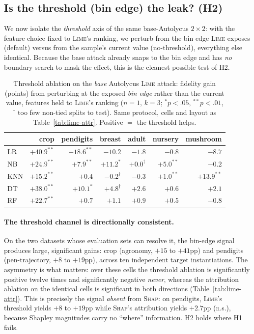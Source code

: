 \documentclass[sigconf,anonymous,review]{acmart}
\begin{document}
\subsection{Is the threshold (bin edge) the leak? (H2)}
\label{subsec:e3}
We now isolate the \emph{threshold} axis of the same base-Autolycus $2{\times}2$: with the feature
choice fixed to \textsc{Lime}'s ranking, we perturb from the bin edge \textsc{Lime} exposes (default)
versus from the sample's current value (no-threshold), everything else identical. Because the base
attack already snaps to the bin edge and has \emph{no} boundary search to mask the effect, this is
the cleanest possible test of H2.

\begin{table}[t]
\centering
\caption{Threshold ablation on the \emph{base} Autolycus \textsc{Lime} attack: fidelity gain (points) from perturbing at the
exposed \emph{bin edge} rather than the current value, features held to \textsc{Lime}'s ranking
($n{=}1$, $k{=}3$; $^{*}p{<}.05$, $^{**}p{<}.01$, $^{\dag}$ too few non-tied splits to test). Same
protocol, cells and layout as Table~\ref{tab:lime-attr}. Positive $=$ the threshold helps.}
\label{tab:lime-threshold}
\begin{tabular}{lrrrrrr}
\toprule
 & crop & pendigits & breast & adult & nursery & mushroom \\
\midrule
LR  & $+40.9^{**}$ & $+18.6^{**}$ & $-10.2$        & $-1.8$        & $-0.8$      & $-8.7$ \\
NB  & $+24.9^{**}$ & $+7.9^{**}$  & $+11.2^{*}$    & $+0.0^{\dag}$ & $+5.0^{**}$ & $-0.2$ \\
KNN & $+15.2^{**}$ & $+0.4$       & $-0.2^{\dag}$  & $-0.3$        & $+1.0^{**}$ & $+13.9^{**}$ \\
DT  & $+38.0^{**}$ & $+10.1^{*}$  & $+4.8^{\dag}$  & $+2.6$        & $+0.6$      & $+2.1$ \\
RF  & $+22.7^{**}$ & $+0.7$       & $+1.1$         & $+0.9$        & $+0.5$      & $-0.8$ \\
\bottomrule
\end{tabular}
\end{table}

\paragraph{The threshold channel is directionally consistent.} On the two datasets whose evaluation
sets can resolve it, the bin-edge signal produces large, significant gains: crop (agronomy, $+15$ to
$+41$pp) and pendigits (pen-trajectory, $+8$ to $+19$pp), across ten independent target
instantiations. The asymmetry is what matters: over these cells the threshold ablation is
significantly positive twelve times and significantly negative \emph{never}, whereas the attribution
ablation on the identical cells is significant in both directions
(Table~\ref{tab:lime-attr}). This is precisely the signal \emph{absent} from \textsc{Shap}: on
pendigits, \textsc{Lime}'s threshold yields $+8$ to $+19$pp while \textsc{Shap}'s attribution yields
$+2.7$pp (n.s.), because Shapley magnitudes carry no ``where'' information. H2 holds where H1 fails.
\end{document}
